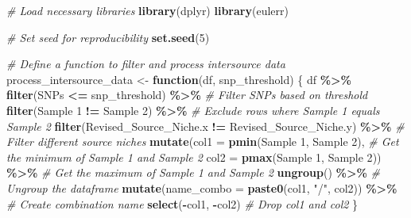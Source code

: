 \documentclass[
]{article}
\newenvironment{Shaded}{\begin{snugshade}}{\end{snugshade}}
\newcommand{\AttributeTok}[1]{\textcolor[rgb]{0.13,0.29,0.53}{#1}}
\newcommand{\CommentTok}[1]{\textcolor[rgb]{0.56,0.35,0.01}{\textit{#1}}}
\newcommand{\ControlFlowTok}[1]{\textcolor[rgb]{0.13,0.29,0.53}{\textbf{#1}}}
\newcommand{\DecValTok}[1]{\textcolor[rgb]{0.00,0.00,0.81}{#1}}
\newcommand{\FunctionTok}[1]{\textcolor[rgb]{0.13,0.29,0.53}{\textbf{#1}}}
\newcommand{\NormalTok}[1]{#1}
\newcommand{\OtherTok}[1]{\textcolor[rgb]{0.56,0.35,0.01}{#1}}
\newcommand{\SpecialCharTok}[1]{\textcolor[rgb]{0.81,0.36,0.00}{\textbf{#1}}}
\newcommand{\StringTok}[1]{\textcolor[rgb]{0.31,0.60,0.02}{#1}}
\begin{document}
\begin{Shaded}
\begin{Highlighting}[]
\CommentTok{\# Load necessary libraries}
\FunctionTok{library}\NormalTok{(dplyr)}
\FunctionTok{library}\NormalTok{(eulerr)}

\CommentTok{\# Set seed for reproducibility}
\FunctionTok{set.seed}\NormalTok{(}\DecValTok{5}\NormalTok{)}

\CommentTok{\# Define a function to filter and process intersource data}
\NormalTok{process\_intersource\_data }\OtherTok{\textless{}{-}} \ControlFlowTok{function}\NormalTok{(df, snp\_threshold) \{}
\NormalTok{  df }\SpecialCharTok{\%\textgreater{}\%}
    \FunctionTok{filter}\NormalTok{(SNPs }\SpecialCharTok{\textless{}=}\NormalTok{ snp\_threshold) }\SpecialCharTok{\%\textgreater{}\%}                    \CommentTok{\# Filter SNPs based on threshold}
    \FunctionTok{filter}\NormalTok{(}\StringTok{\textasciigrave{}}\AttributeTok{Sample 1}\StringTok{\textasciigrave{}} \SpecialCharTok{!=} \StringTok{\textasciigrave{}}\AttributeTok{Sample 2}\StringTok{\textasciigrave{}}\NormalTok{) }\SpecialCharTok{\%\textgreater{}\%}                 \CommentTok{\# Exclude rows where Sample 1 equals Sample 2}
    \FunctionTok{filter}\NormalTok{(Revised\_Source\_Niche.x }\SpecialCharTok{!=}\NormalTok{ Revised\_Source\_Niche.y) }\SpecialCharTok{\%\textgreater{}\%}  \CommentTok{\# Filter different source niches}
    \FunctionTok{mutate}\NormalTok{(}\AttributeTok{col1 =} \FunctionTok{pmin}\NormalTok{(}\StringTok{\textasciigrave{}}\AttributeTok{Sample 1}\StringTok{\textasciigrave{}}\NormalTok{, }\StringTok{\textasciigrave{}}\AttributeTok{Sample 2}\StringTok{\textasciigrave{}}\NormalTok{),          }\CommentTok{\# Get the minimum of Sample 1 and Sample 2}
           \AttributeTok{col2 =} \FunctionTok{pmax}\NormalTok{(}\StringTok{\textasciigrave{}}\AttributeTok{Sample 1}\StringTok{\textasciigrave{}}\NormalTok{, }\StringTok{\textasciigrave{}}\AttributeTok{Sample 2}\StringTok{\textasciigrave{}}\NormalTok{)) }\SpecialCharTok{\%\textgreater{}\%}      \CommentTok{\# Get the maximum of Sample 1 and Sample 2}
    \FunctionTok{ungroup}\NormalTok{() }\SpecialCharTok{\%\textgreater{}\%}                                        \CommentTok{\# Ungroup the dataframe}
    \FunctionTok{mutate}\NormalTok{(}\AttributeTok{name\_combo =} \FunctionTok{paste0}\NormalTok{(col1, }\StringTok{"/"}\NormalTok{, col2)) }\SpecialCharTok{\%\textgreater{}\%}     \CommentTok{\# Create combination name}
    \FunctionTok{select}\NormalTok{(}\SpecialCharTok{{-}}\NormalTok{col1, }\SpecialCharTok{{-}}\NormalTok{col2)                                 }\CommentTok{\# Drop col1 and col2}
\NormalTok{\}}


\end{Highlighting}
\end{Shaded}
\end{document}
